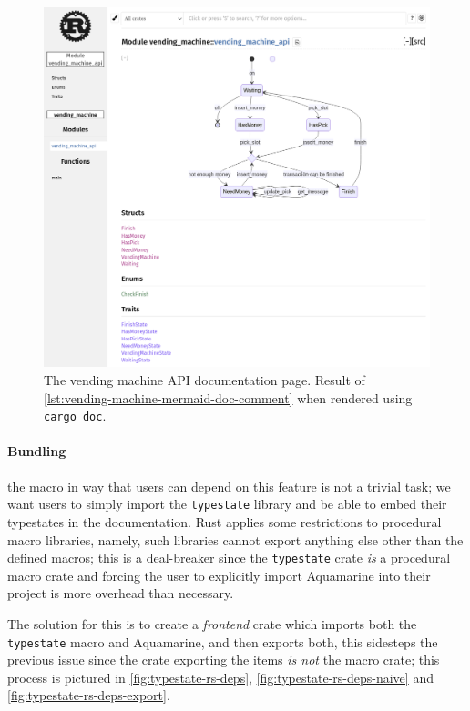 \begin{figure}
    \centering
    \includegraphics[width=\textwidth]{Chapters/Figures/C4/vending-machine-rustdoc-mermaid.png}
    \caption{
        The vending machine \gls{API} documentation page.
        Result of \autoref{lst:vending-machine-mermaid-doc-comment} when rendered using \texttt{cargo doc}.
    }
    \label{fig:vending-machine-mermaid-docs}
\end{figure}

\paragraph{Bundling} the macro in way that users can depend on this feature is not a trivial task;
we want users to simply import the \texttt{typestate} library and be able to embed their typestates in the documentation.
Rust applies some restrictions to procedural macro libraries, namely,
such libraries cannot export anything else other than the defined macros;
this is a deal-breaker since the \texttt{typestate} crate \emph{is} a procedural macro crate and
forcing the user to explicitly import Aquamarine into their project is more overhead than necessary.

The solution for this is to create a \emph{frontend} crate which imports both the \texttt{typestate} macro and Aquamarine,
and then exports both, this sidesteps the previous issue since the crate exporting the items \emph{is not} the macro crate;
this process is pictured in \autoref{fig:typestate-rs-deps}, \autoref{fig:typestate-rs-deps-naive} and \autoref{fig:typestate-rs-deps-export}.

